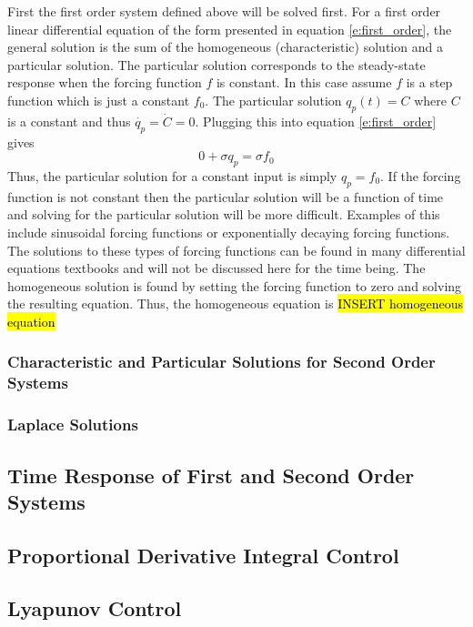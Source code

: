 First the first order system defined above will be solved first. For a first order linear differential equation of the form presented in equation \ref{e:first_order}, the general solution is the sum of the homogeneous (characteristic) solution and a particular solution. The particular solution corresponds to the steady-state response when the forcing function $f$ is constant. In this case assume $f$ is a step function which is just a constant $f_0$. The particular solution $q_p(t)=C$ where $C$ is a constant and thus $\dot{q_p}=\dot{C}=0.$ Plugging this into equation \ref{e:first_order} gives
\begin{equation}
    0 + \sigma q_p = \sigma f_0 
\end{equation}
Thus, the particular solution for a constant input is simply $q_p = f_0$. If the forcing function is not constant then the particular solution will be a function of time and solving for the particular solution will be more difficult. Examples of this include sinusoidal forcing functions or exponentially decaying forcing functions. The solutions to these types of forcing functions can be found in many differential equations textbooks and will not be discussed here for the time being. The homogeneous solution is found by setting the forcing function to zero and solving the resulting equation. Thus, the homogeneous equation is
\hl{INSERT homogeneous equation}

\subsubsection{Characteristic and Particular Solutions for Second Order Systems}

\subsubsection{Laplace Solutions}

\subsection{Time Response of First and Second Order Systems}

\subsection{Proportional Derivative Integral Control}

\subsection{Lyapunov Control}

